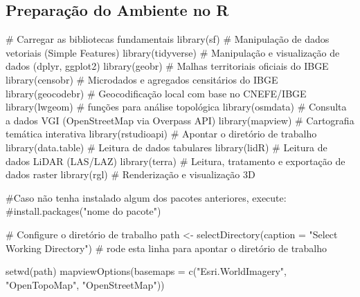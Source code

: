 \documentclass[
  letterpaper,
  DIV=11,
  numbers=noendperiod]{scrreprt}
\newenvironment{Shaded}{\begin{snugshade}}{\end{snugshade}}
\newcommand{\AttributeTok}[1]{\textcolor[rgb]{0.40,0.45,0.13}{#1}}
\newcommand{\CommentTok}[1]{\textcolor[rgb]{0.37,0.37,0.37}{#1}}
\newcommand{\FunctionTok}[1]{\textcolor[rgb]{0.28,0.35,0.67}{#1}}
\newcommand{\NormalTok}[1]{\textcolor[rgb]{0.00,0.23,0.31}{#1}}
\newcommand{\OtherTok}[1]{\textcolor[rgb]{0.00,0.23,0.31}{#1}}
\newcommand{\StringTok}[1]{\textcolor[rgb]{0.13,0.47,0.30}{#1}}
\begin{document}
\subsection{\texorpdfstring{\textbf{Preparação do Ambiente no
R}}{Preparação do Ambiente no R}}\label{preparauxe7uxe3o-do-ambiente-no-r-2}

\begin{Shaded}
\begin{Highlighting}[]
\CommentTok{\# Carregar as bibliotecas fundamentais }
\FunctionTok{library}\NormalTok{(sf)          }\CommentTok{\# Manipulação de dados vetoriais (Simple Features)}
\FunctionTok{library}\NormalTok{(tidyverse)   }\CommentTok{\# Manipulação e visualização de dados (dplyr, ggplot2)}
\FunctionTok{library}\NormalTok{(geobr)       }\CommentTok{\# Malhas territoriais oficiais do IBGE}
\FunctionTok{library}\NormalTok{(censobr)     }\CommentTok{\# Microdados e agregados censitários do IBGE}
\FunctionTok{library}\NormalTok{(geocodebr)   }\CommentTok{\# Geocodificação local com base no CNEFE/IBGE}
\FunctionTok{library}\NormalTok{(lwgeom)      }\CommentTok{\# funções para análise topológica}
\FunctionTok{library}\NormalTok{(osmdata)     }\CommentTok{\# Consulta a dados VGI (OpenStreetMap via Overpass API)}
\FunctionTok{library}\NormalTok{(mapview)     }\CommentTok{\# Cartografia temática interativa}
\FunctionTok{library}\NormalTok{(rstudioapi)  }\CommentTok{\# Apontar o diretório de trabalho}
\FunctionTok{library}\NormalTok{(data.table)  }\CommentTok{\# Leitura de dados tabulares}
\FunctionTok{library}\NormalTok{(lidR)        }\CommentTok{\# Leitura de dados LiDAR (LAS/LAZ)}
\FunctionTok{library}\NormalTok{(terra)       }\CommentTok{\# Leitura, tratamento e exportação de dados raster}
\FunctionTok{library}\NormalTok{(rgl)         }\CommentTok{\# Renderização e visualização 3D}

\CommentTok{\#Caso não tenha instalado algum dos pacotes anteriores, execute: }
\CommentTok{\#install.packages("nome do pacote")}

\CommentTok{\# Configure o diretório de trabalho}
\NormalTok{path }\OtherTok{\textless{}{-}} \FunctionTok{selectDirectory}\NormalTok{(}\AttributeTok{caption =} \StringTok{"Select Working Directory"}\NormalTok{) }\CommentTok{\# rode esta linha para apontar o diretório de trabalho}

\FunctionTok{setwd}\NormalTok{(path)}
\FunctionTok{mapviewOptions}\NormalTok{(}\AttributeTok{basemaps =} \FunctionTok{c}\NormalTok{(}\StringTok{"Esri.WorldImagery"}\NormalTok{, }\StringTok{"OpenTopoMap"}\NormalTok{, }\StringTok{"OpenStreetMap"}\NormalTok{))}
\end{Highlighting}
\end{Shaded}
\end{document}
